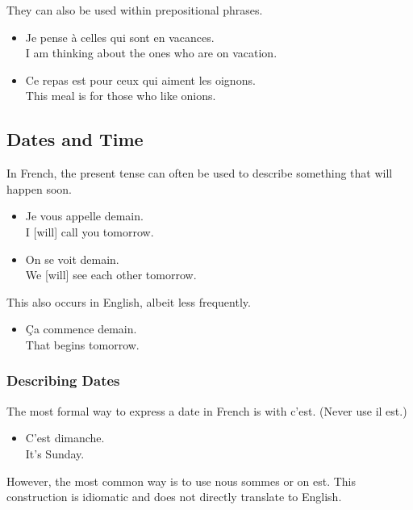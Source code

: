 They can also be used within prepositional phrases. 

\begin{itemize}
  \item  Je pense {\`a} celles qui sont en vacances. \\ I am thinking about the ones who are on vacation.
  \item  Ce repas est pour ceux qui aiment les oignons. \\ This meal is for those who like onions.
\end{itemize}


\pagebreak
\subsection{Dates and Time}

In French, the present tense can often be used to describe something that will happen soon.

\begin{itemize}
  \item  Je vous appelle demain. \\ I [will] call you tomorrow.
  \item  On se voit demain. \\ We [will] see each other tomorrow.
\end{itemize}

This also occurs in English, albeit less frequently.

\begin{itemize}
  \item  {\c C}a commence demain. \\ That begins tomorrow.
\end{itemize}

\subsubsection{Describing Dates}

The most formal way to express a date in French is with c'est. (Never use il est.)

\begin{itemize}
  \item  C'est dimanche. \\ It's Sunday.
\end{itemize}

However, the most common way is to use nous sommes or on est. This construction is idiomatic and does not directly translate to English.

